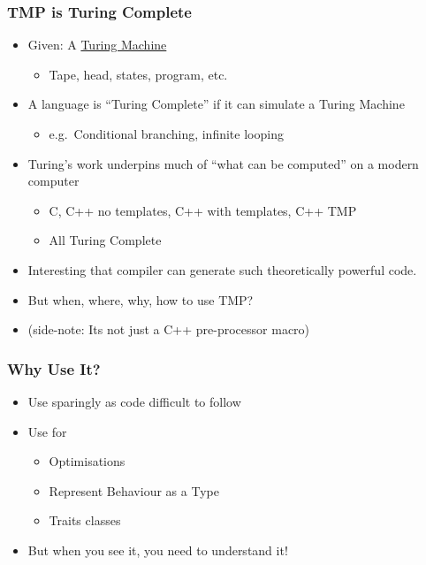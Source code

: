 \subsubsection{TMP is Turing Complete}\label{tmp-is-turing-complete}

\begin{itemize}
\itemsep1pt\parskip0pt
\item
  Given: A \href{http://en.wikipedia.org/wiki/Turing_machine}{Turing
  Machine}

  \begin{itemize}
  \itemsep1pt\parskip0pt
  \item
    Tape, head, states, program, etc.
  \end{itemize}
\item
  A language is ``Turing Complete'' if it can simulate a Turing Machine

  \begin{itemize}
  \itemsep1pt\parskip0pt
  \item
    e.g.~Conditional branching, infinite looping
  \end{itemize}
\item
  Turing's work underpins much of ``what can be computed'' on a modern
  computer

  \begin{itemize}
  \itemsep1pt\parskip0pt
  \item
    C, C++ no templates, C++ with templates, C++ TMP
  \item
    All Turing Complete
  \end{itemize}
\item
  Interesting that compiler can generate such theoretically powerful
  code.\\
\item
  But when, where, why, how to use TMP?\\
\item
  (side-note: Its not just a C++ pre-processor macro)
\end{itemize}

\subsubsection{Why Use It?}\label{why-use-it}

\begin{itemize}
\itemsep1pt\parskip0pt
\item
  Use sparingly as code difficult to follow
\item
  Use for

  \begin{itemize}
  \itemsep1pt\parskip0pt
  \item
    Optimisations
  \item
    Represent Behaviour as a Type
  \item
    Traits classes
  \end{itemize}
\item
  But when you see it, you need to understand it!
\end{itemize}

